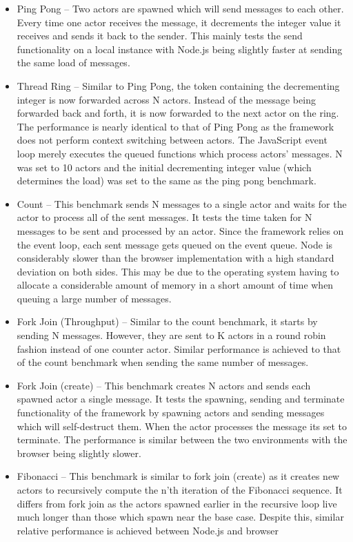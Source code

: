 \documentclass[12pt, a4paper]{report}
\theoremstyle{definition}
\theoremstyle{definition}%
\theoremstyle{definition}%
\theoremstyle{definition}%
\theoremstyle{definition}%
\theoremstyle{definition}%
\begin{document}
\begin{itemize}
    \item Ping Pong – Two actors are spawned which will send messages to each other. Every time one actor receives the message, it decrements the integer value it receives and sends it back to the sender. This mainly tests the send functionality on a local instance with Node.js being slightly faster at sending the same load of messages.
    \item Thread Ring – Similar to Ping Pong, the token containing the decrementing integer is now forwarded across N actors. Instead of the message being forwarded back and forth, it is now forwarded to the next actor on the ring. The performance is nearly identical to that of Ping Pong as the framework does not perform context switching between actors. The JavaScript event loop merely executes the queued functions which process actors’ messages. N was set to 10 actors and the initial decrementing integer value (which determines the load) was set to the same as the ping pong benchmark.
    \item Count – This benchmark sends N messages to a single actor and waits for the actor to process all of the sent messages. It tests the time taken for N messages to be sent and processed by an actor. Since the framework relies on the event loop, each sent message gets queued on the event queue. Node is considerably slower than the browser implementation with a high standard deviation on both sides. This may be due to the operating system having to allocate a considerable amount of memory in a short amount of time when queuing a large number of messages.
    \item Fork Join (Throughput) – Similar to the count benchmark, it starts by sending N messages. However, they are sent to K actors in a round robin fashion instead of one counter actor. Similar performance is achieved to that of the count benchmark when sending the same number of messages.
    \item Fork Join (create) – This benchmark creates N actors and sends each spawned actor a single message. It tests the spawning, sending and terminate functionality of the framework by spawning actors and sending messages which will self-destruct them. When the actor processes the message its set to terminate. The performance is similar between the two environments with the browser being slightly slower.
    \item Fibonacci – This benchmark is similar to fork join (create) as it creates new actors to recursively compute the n’th iteration of the Fibonacci sequence. It differs from fork join as the actors spawned earlier in the recursive loop live much longer than those which spawn near the base case. Despite this, similar relative performance is achieved between Node.js and browser

\end{itemize}
\end{document}
